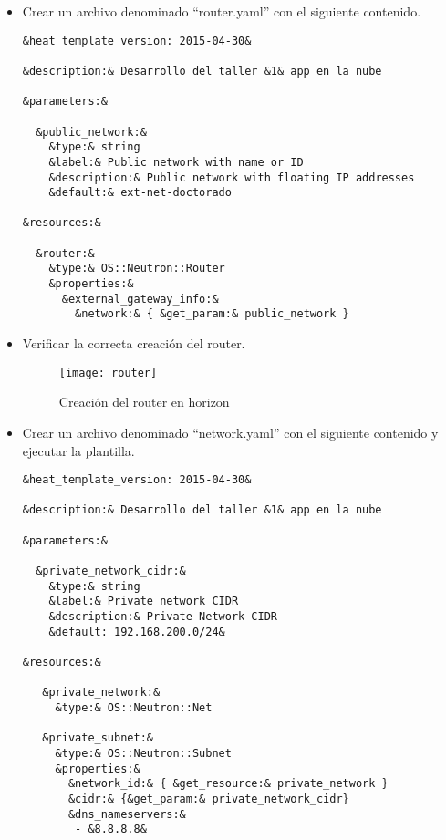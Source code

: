 \documentclass[10pt]{article}   			%
\begin{document}
\begin{itemize}		
\item Crear un archivo denominado “router.yaml” con el siguiente contenido. 
\begin{small}
\begin{lstlisting}[frame=single,style=base]	
&heat_template_version: 2015-04-30&

&description:& Desarrollo del taller &1& app en la nube

&parameters:&

  &public_network:&
    &type:& string
    &label:& Public network with name or ID
    &description:& Public network with floating IP addresses
    &default:& ext-net-doctorado

&resources:&

  &router:&
    &type:& OS::Neutron::Router
    &properties:&
      &external_gateway_info:&
        &network:& { &get_param:& public_network }
\end{lstlisting}
\end{small}

\item Verificar la correcta creación del router.
\begin{figure}[ht] 
	\centering
		\texttt{[image: router]}   
	\caption{Creación del router en horizon} \label{fig:Router}
\end{figure}

\item Crear un archivo denominado “network.yaml” con el siguiente contenido y ejecutar la plantilla.
\begin{small}
\begin{lstlisting}[frame=single,style=base]	
&heat_template_version: 2015-04-30&

&description:& Desarrollo del taller &1& app en la nube

&parameters:&

  &private_network_cidr:&
    &type:& string
    &label:& Private network CIDR
    &description:& Private Network CIDR
    &default: 192.168.200.0/24&

&resources:&

   &private_network:&
     &type:& OS::Neutron::Net

   &private_subnet:&
     &type:& OS::Neutron::Subnet
     &properties:&
       &network_id:& { &get_resource:& private_network }
       &cidr:& {&get_param:& private_network_cidr}
       &dns_nameservers:& 
        - &8.8.8.8&
\end{lstlisting}
\end{small}


\end{itemize}
\end{document}
